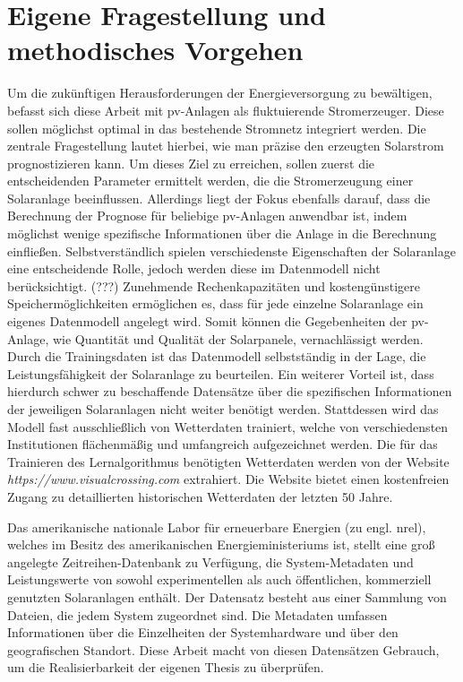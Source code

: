 \documentclass[12pt, a4paper]{article}
\begin{document}
\newpage

\section{Eigene Fragestellung und methodisches Vorgehen}

Um die zukünftigen Herausforderungen der Energieversorgung zu bewältigen, befasst sich diese Arbeit mit \ac{pv}-Anlagen als fluktuierende Stromerzeuger. Diese sollen möglichst optimal in das bestehende Stromnetz integriert werden. Die zentrale Fragestellung lautet hierbei, wie man präzise den erzeugten Solarstrom prognostizieren kann. Um dieses Ziel zu erreichen, sollen zuerst die entscheidenden Parameter ermittelt werden, die die Stromerzeugung einer Solaranlage beeinflussen. Allerdings liegt der Fokus ebenfalls darauf, dass die Berechnung der Prognose für beliebige \ac{pv}-Anlagen anwendbar ist, indem möglichst wenige spezifische Informationen über die Anlage in die Berechnung einfließen. Selbstverständlich spielen verschiedenste Eigenschaften der Solaranlage eine entscheidende Rolle, jedoch werden diese im Datenmodell nicht berücksichtigt. (???) Zunehmende Rechenkapazitäten und kostengünstigere Speichermöglichkeiten ermöglichen es, dass für jede einzelne Solaranlage ein eigenes Datenmodell angelegt wird. Somit können die Gegebenheiten der \ac{pv}-Anlage, wie Quantität und Qualität der Solarpanele, vernachlässigt werden. Durch die Trainingsdaten ist das Datenmodell selbstständig in der Lage, die Leistungsfähigkeit der Solaranlage zu beurteilen. Ein weiterer Vorteil ist, dass hierdurch schwer zu beschaffende Datensätze über die spezifischen Informationen der jeweiligen Solaranlagen nicht weiter benötigt werden. Stattdessen wird das Modell fast ausschließlich von Wetterdaten trainiert, welche von verschiedensten Institutionen flächenmäßig und umfangreich aufgezeichnet werden. Die für das Trainieren des Lernalgorithmus benötigten Wetterdaten werden von der Website \textit{https://www.visualcrossing.com} extrahiert. Die Website bietet einen kostenfreien Zugang zu detaillierten historischen Wetterdaten der letzten 50 Jahre.

Das amerikanische nationale Labor für erneuerbare Energien (zu engl. \ac{nrel}), welches im Besitz des amerikanischen Energieministeriums ist, stellt eine groß angelegte Zeitreihen-Datenbank zu Verfügung, die System-Metadaten und Leistungswerte von sowohl experimentellen als auch öffentlichen, kommerziell genutzten Solaranlagen enthält.  Der Datensatz besteht aus einer Sammlung von Dateien, die jedem System zugeordnet sind. Die Metadaten umfassen Informationen über die Einzelheiten der Systemhardware und über den geografischen Standort. Diese Arbeit macht von diesen Datensätzen Gebrauch, um die Realisierbarkeit der eigenen Thesis zu überprüfen. 
\end{document}
